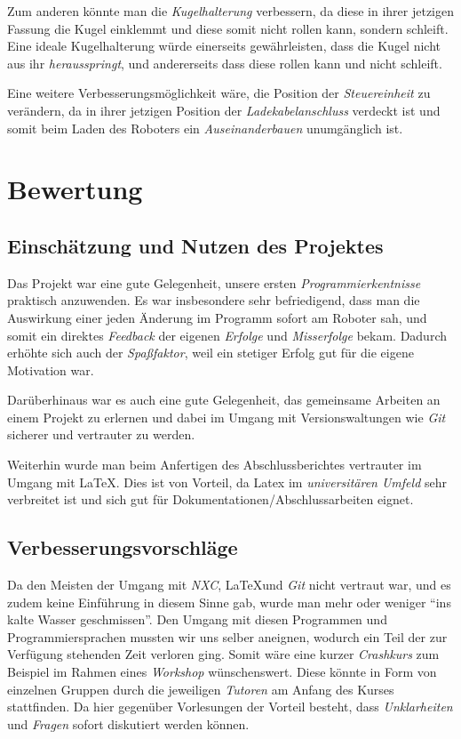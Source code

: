 \documentclass[a4paper]{article}
\begin{document}
Zum anderen könnte man die \emph{Kugelhalterung} verbessern, da diese
in ihrer jetzigen Fassung die Kugel einklemmt und diese somit nicht
rollen kann, sondern schleift. Eine ideale Kugelhalterung würde
einerseits gewährleisten, dass die Kugel nicht aus ihr
\emph{herausspringt}, und andererseits dass diese rollen kann und
nicht schleift.

Eine weitere Verbesserungsmöglichkeit wäre, die Position der
\emph{Steuereinheit} zu verändern, da in ihrer jetzigen Position der
\emph{Ladekabelanschluss} verdeckt ist und somit beim Laden des
Roboters ein \emph{Auseinanderbauen} unumgänglich ist.

\section{Bewertung}
\subsection{Einschätzung und Nutzen des Projektes}

Das Projekt war eine gute Gelegenheit, unsere ersten
\emph{Programmierkentnisse} praktisch anzuwenden. Es war insbesondere
sehr befriedigend, dass man die Auswirkung einer jeden Änderung im
Programm sofort am Roboter sah, und somit ein direktes \emph{Feedback}
der eigenen \emph{Erfolge} und \emph{Misserfolge} bekam. Dadurch
erhöhte sich auch der \emph{Spaßfaktor}, weil ein stetiger Erfolg gut
für die eigene Motivation war.

Darüberhinaus war es auch eine gute Gelegenheit, das gemeinsame
Arbeiten an einem Projekt zu erlernen und dabei im Umgang mit
Versionswaltungen wie \emph{Git} sicherer und vertrauter zu werden.

Weiterhin wurde man beim Anfertigen des Abschlussberichtes vertrauter
im Umgang mit \LaTeX. Dies ist von Vorteil, da Latex im
\emph{universitären Umfeld} sehr verbreitet ist und sich gut für
Dokumentationen/Abschlussarbeiten eignet.

\subsection{Verbesserungsvorschläge}

Da den Meisten der Umgang mit \emph{NXC}, \LaTeX und \emph{Git} nicht
vertraut war, und es zudem keine Einführung in diesem Sinne gab, wurde
man mehr oder weniger "`ins kalte Wasser geschmissen"'. Den Umgang mit
diesen Programmen und Programmiersprachen mussten wir uns selber
aneignen, wodurch ein Teil der zur Verfügung stehenden Zeit verloren
ging. Somit wäre eine kurzer \emph{Crashkurs} zum Beispiel im Rahmen
eines \emph{Workshop} wünschenswert. Diese könnte in Form von
einzelnen Gruppen durch die jeweiligen \emph{Tutoren} am Anfang des
Kurses stattfinden. Da hier gegenüber Vorlesungen der Vorteil besteht,
dass \emph{Unklarheiten} und \emph{Fragen} sofort diskutiert werden
können.
\end{document}
